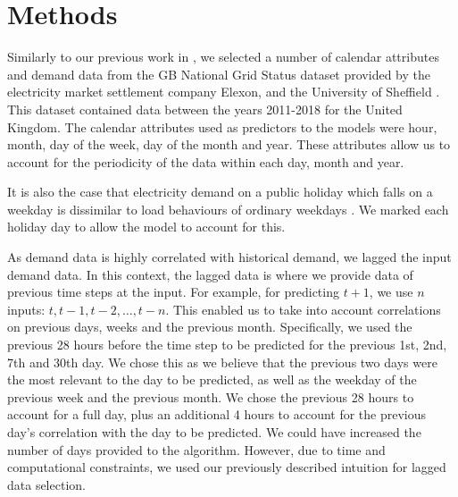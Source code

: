 \documentclass[final,3p,times,twocolumn,numbers]{elsarticle}
\begin{document}
\section{Methods}
\label{sec:methods}



Similarly to our previous work in \cite{Kell2018a}, we selected a number of calendar attributes and demand data from the GB National Grid Status dataset provided by the electricity market settlement company Elexon, and the University of Sheffield \cite{gbnationalgridstatus_2019}. This dataset contained data between the years 2011-2018 for the United Kingdom. The calendar attributes used as predictors to the models were hour, month, day of the week, day of the month and year. These attributes allow us to account for the periodicity of the data within each day, month and year.

It is also the case that electricity demand on a public holiday which falls on a weekday is dissimilar to load behaviours of ordinary weekdays \cite{Kim2000}. We marked each holiday day to allow the model to account for this.

As demand data is highly correlated with historical demand, we lagged the input demand data. In this context, the lagged data is where we provide data of previous time steps at the input. For example, for predicting $t+1$, we use $n$ inputs: $t,t-1,t-2,\ldots,t-n$. This enabled us to take into account correlations on previous days, weeks and the previous month. Specifically, we used the previous 28 hours before the time step to be predicted for the previous 1st, 2nd, 7th and 30th day. We chose this as we believe that the previous two days were the most relevant to the day to be predicted, as well as the weekday of the previous week and the previous month. We chose the previous 28 hours to account for a full day, plus an additional 4 hours to account for the previous day's correlation with the day to be predicted. We could have increased the number of days provided to the algorithm. However, due to time and computational constraints, we used our previously described intuition for lagged data selection. %
\end{document}
